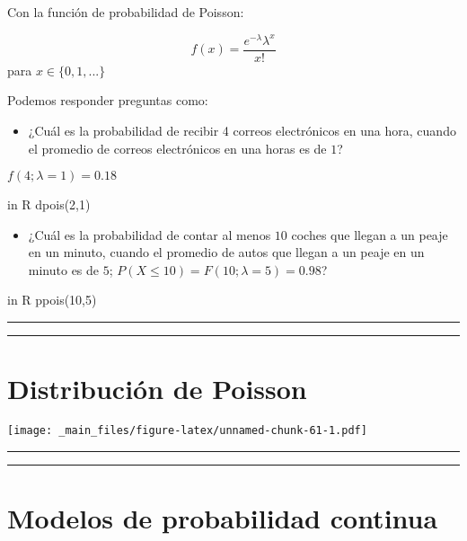 \documentclass[
]{book}
\providecommand{\tightlist}{%
  \setlength{\itemsep}{0pt}\setlength{\parskip}{0pt}}
\begin{document}
Con la función de probabilidad de Poisson:

\[f(x)= \frac{e^{-\lambda}\lambda^x}{x!}\] para \(x \in \{0, 1, ...\}\)

Podemos responder preguntas como:

\begin{itemize}
\tightlist
\item
  ¿Cuál es la probabilidad de recibir 4 correos electrónicos en una hora, cuando el promedio de correos electrónicos en una horas es de \(1\)?
\end{itemize}

\(f(4; \lambda=1)= 0.18\)

in R dpois(2,1)

\begin{itemize}
\tightlist
\item
  ¿Cuál es la probabilidad de contar al menos \(10\) coches que llegan a un peaje en un minuto, cuando el promedio de autos que llegan a un peaje en un minuto es de \(5\);
  \(P(X \leq 10)=F(10; \lambda=5)=0.98\)?
\end{itemize}

in R ppois(10,5)

\begin{center}\rule{0.5\linewidth}{0.5pt}\end{center}

\begin{center}\rule{0.5\linewidth}{0.5pt}\end{center}

\hypertarget{distribuciuxf3n-de-poisson-5}{%
\section{Distribución de Poisson}\label{distribuciuxf3n-de-poisson-5}}

\texttt{[image: \_main\_files/figure-latex/unnamed-chunk-61-1.pdf]}

\begin{center}\rule{0.5\linewidth}{0.5pt}\end{center}

\begin{center}\rule{0.5\linewidth}{0.5pt}\end{center}

\hypertarget{modelos-de-probabilidad-continua}{%
\section{Modelos de probabilidad continua}\label{modelos-de-probabilidad-continua}}
\end{document}
